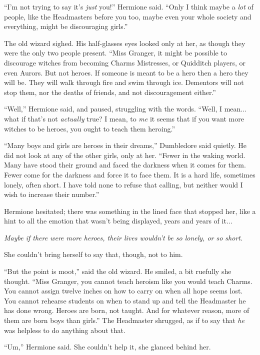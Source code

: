 ``I'm not trying to say it's \emph{just} you!'' Hermione said. ``Only I think maybe a \emph{lot} of people, like the Headmasters before you too, maybe even your whole society and everything, might be discouraging girls.''

The old wizard sighed. His half-glasses eyes looked only at her, as though they were the only two people present. ``Miss Granger, it might be possible to discourage witches from becoming Charms Mistresses, or Quidditch players, or even Aurors. But not heroes. If someone is meant to be a hero then a hero they will be. They will walk through fire and swim through ice. Dementors will not stop them, nor the deaths of friends, and not discouragement either.''

``Well,'' Hermione said, and paused, struggling with the words. ``Well, I mean... what if that's not \emph{actually} true? I mean, to \emph{me} it seems that if you want more witches to be heroes, you ought to teach them heroing.''

``Many boys and girls are heroes in their dreams,'' Dumbledore said quietly. He did not look at any of the other girls, only at her. ``Fewer in the waking world. Many have stood their ground and faced the darkness when it comes for them. Fewer come for the darkness and force it to face them. It is a hard life, sometimes lonely, often short. I have told none to refuse that calling, but neither would I wish to increase their number.''

Hermione hesitated; there was something in the lined face that stopped her, like a hint to all the emotion that wasn't being displayed, years and years of it...

\emph{Maybe if there were more heroes, their lives wouldn't be so lonely, or so short.}

She couldn't bring herself to say that, though, not to him.

``But the point is moot,'' said the old wizard. He smiled, a bit ruefully she thought. ``Miss Granger, you cannot teach heroism like you would teach Charms. You cannot assign twelve inches on how to carry on when all hope seems lost. You cannot rehearse students on when to stand up and tell the Headmaster he has done wrong. Heroes are born, not taught. And for whatever reason, more of them are born boys than girls.'' The Headmaster shrugged, as if to say that \emph{he} was helpless to do anything about that.

``Um,'' Hermione said. She couldn't help it, she glanced behind her.


